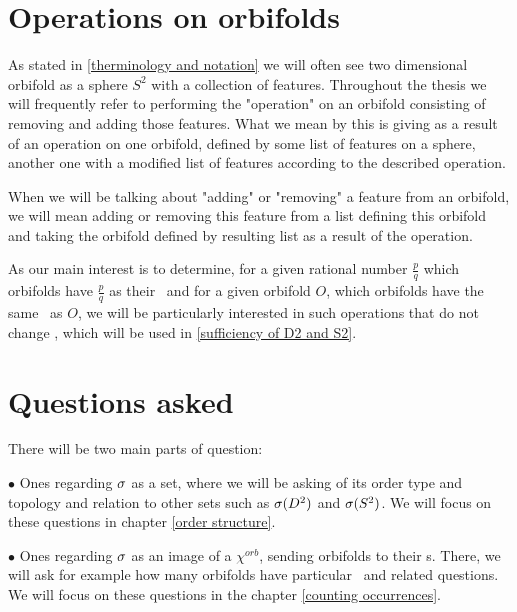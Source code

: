 \section{Operations on orbifolds}\label{Operations}
As stated in \ref{therminology and notation} we will often see two dimensional orbifold 
as a sphere $S^2$ with a collection of features.
Throughout the thesis we will frequently refer to performing the "operation" on an orbifold 
consisting of removing and adding those features. 
What we mean by this is giving as a result of an operation on one orbifold, defined 
by some list of features on a sphere, another one 
with a modified list of features according to the described operation. 

When we will be talking about "adding" or "removing" a feature from an orbifold, we 
will mean adding or removing this feature from a list defining this orbifold and 
taking the orbifold defined by resulting list as a result of the operation.
 
As our main interest is to determine, for a given rational number 
$\frac{p}{q}$ which orbifolds have $\frac{p}{q}$ as their \Eoc\ and for a given 
orbifold $O$, which orbifolds 
have the same \Eoc\ as $O$, we will be particularly interested in such operations 
that do not change \Eoc, which will be used in \ref{sufficiency of D2 and S2}.





\label{moving from interior to boundary}


\section{Questions asked}
There will be two main parts of question: 

$\bullet$ Ones regarding ${\sigma}$ as a set, where we will be asking 
of its order type and topology and relation to other sets such as ${{\sigma}(D^2)}$ and ${{\sigma}(S^2)}$. 
We will focus on these questions in chapter \ref{order structure}. 

$\bullet$ Ones regarding ${\sigma}$ as an image of a $\chi^{orb}$, sending orbifolds to their \Eoc s. 
There, we will ask for example how many orbifolds have particular \Eoc\ and 
related questions. We will focus on these questions in the chapter \ref{counting occurrences}.  






